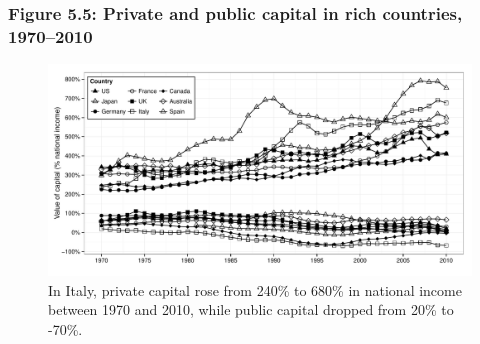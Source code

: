 \documentclass[t]{beamer}\usepackage[]{graphicx}\usepackage[]{color}
\newenvironment{knitrout}{}{} %
\begin{document}
\begin{frame}[label=Figure_5_5]
\frametitle{Figure 5.5: Private and public capital in rich countries, 1970--2010}
\begin{figure}[t]
\begin{minipage}[b]{\textwidth}
\centering
\begin{knitrout}\footnotesize
{}\color{fgcolor}

{\centering \includegraphics[width=1\linewidth,height=0.75\textheight]{figures/bw/Figure_5_5} 

}



\end{knitrout}
\caption{In Italy, private capital rose from 240\% to 680\% in national income between 1970 and 2010, while public capital dropped from 20\% to -70\%.}
\end{minipage}
\end{figure}
\end{frame}
\end{document}
